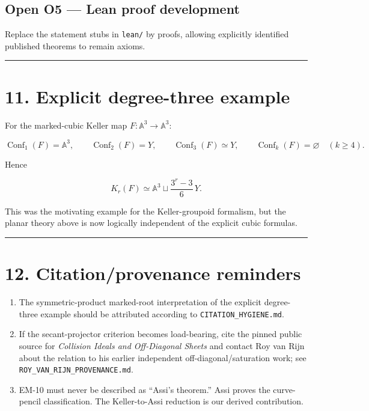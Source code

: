 \subsection{Open O5 --- Lean proof
development}\label{open-o5-lean-proof-development}

Replace the statement stubs in \texttt{lean/} by proofs, allowing
explicitly identified published theorems to remain axioms.

\begin{center}\rule{0.5\linewidth}{0.5pt}\end{center}

\section{11. Explicit degree-three
example}\label{explicit-degree-three-example}

For the marked-cubic Keller map \(F:\mathbb A^3\to\mathbb A^3\):

\[
\operatorname{Conf}_1(F)=\mathbb A^3,
\qquad
\operatorname{Conf}_2(F)=Y,
\qquad
\operatorname{Conf}_3(F)\simeq Y,
\qquad
\operatorname{Conf}_k(F)=\varnothing\quad(k\ge4).
\]

Hence

\[
K_r(F)
\simeq
\mathbb A^3
\sqcup
\frac{3^r-3}{6}\,Y.
\]

This was the motivating example for the Keller-groupoid formalism, but
the planar theory above is now logically independent of the explicit
cubic formulas.

\begin{center}\rule{0.5\linewidth}{0.5pt}\end{center}

\section{12. Citation/provenance
reminders}\label{citationprovenance-reminders}

\begin{enumerate}
\def\labelenumi{\arabic{enumi}.}
\tightlist
\item
  The symmetric-product marked-root interpretation of the explicit
  degree-three example should be attributed according to
  \texttt{CITATION\_HYGIENE.md}.
\item
  If the secant-projector criterion becomes load-bearing, cite the
  pinned public source for \emph{Collision Ideals and Off-Diagonal
  Sheets} and contact Roy van Rijn about the relation to his earlier
  independent off-diagonal/saturation work; see
  \texttt{ROY\_VAN\_RIJN\_PROVENANCE.md}.
\item
  EM-10 must never be described as ``Assi's theorem.'' Assi proves the
  curve-pencil classification. The Keller-to-Assi reduction is our
  derived contribution.
\end{enumerate}

